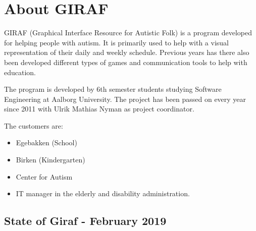 \section{About GIRAF}
GIRAF (Graphical Interface Resource for Autistic Folk) is a program developed for helping people with autism. 
It is primarily used to help with a visual representation of their daily and weekly schedule. Previous years has there also been developed different types of games and communication tools to help with education. 

The program is developed by 6th semester students studying Software Engineering at Aalborg University. 
The project has been passed on every year since 2011 with Ulrik Mathias Nyman as project coordinator. 

The customers are: 
\begin{itemize}
    \item Egebakken (School)
    \item Birken (Kindergarten)
    \item Center for Autism
    \item IT manager in the elderly and disability administration.
\end{itemize}

\subsection{State of Giraf - February 2019}
